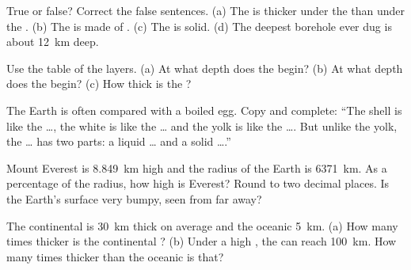 \begin{exercise}[$\star$]\label{exo:g6:inside-the-earth:2}
True or false? Correct the false sentences.
(a) The  is thicker under the  than under the .
(b) The  is made of .
(c) The  is solid.
(d) The deepest borehole ever dug is about 12~km deep.
\end{exercise}

\begin{exercise}[$\star$]\label{exo:g6:inside-the-earth:3}
Use the table of the layers. (a) At what depth does the  begin?
(b) At what depth does the  begin? (c) How thick is the ?
\end{exercise}

\begin{exercise}[$\star$]\label{exo:g6:inside-the-earth:4}
The Earth is often compared with a boiled egg. Copy and complete: ``The
shell is like the \ldots, the white is like the \ldots{} and the yolk is like
the \ldots{}. But unlike the yolk, the \ldots{} has two parts: a liquid
\ldots{} and a solid \ldots{}.''
\end{exercise}

\begin{exercise}[$\star\star$]\label{exo:g6:inside-the-earth:5}
Mount Everest is 8.849~km high and the radius of the Earth is 6371~km. As a
percentage of the radius, how high is Everest? Round to two decimal places.
Is the Earth's surface very bumpy, seen from far away?
\end{exercise}

\begin{exercise}[$\star\star$]\label{exo:g6:inside-the-earth:6}
The continental  is 30~km thick on average and the oceanic 
5~km. (a) How many times thicker is the continental ? (b) Under a high
, the  can reach 100~km. How many times thicker than
the oceanic  is that?
\end{exercise}

